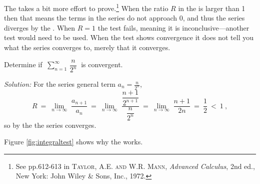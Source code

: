 The  takes a bit more effort to
prove.\footnote{See pp.612-613 in \textsc{Taylor, A.E. and W.R. Mann},
\emph{Advanced Calculus}, 2nd ed., New York: John Wiley \& Sons, Inc., 1972.}
When the ratio $R$ in the  is larger than 1 then that means the terms
in the series do not approach 0, and thus the series diverges by the . When $R=1$ the test fails, meaning it is inconclusive---another test would
need to be used. When the test shows convergence it does not tell you what the
series converges to, merely that it converges.

\newpage

\begin{exmp}
\noindent Determine if $~\displaystyle\sum_{n=1}^{\infty} \,\dfrac{n}{2^n}~$ is
convergent.\vspace{1mm}
\par\noindent\emph{Solution:} For the series general term $a_n = \frac{n}{2^n}$,
\[
R ~=~ \lim_{n \to \infty} \;\frac{a_{n+1}}{a_n} ~=~
\lim_{n \to \infty} \;\dfrac{\dfrac{n+1}{2^{n+1}}}{\dfrac{n}{2^n}} ~=~
\lim_{n \to \infty} \;\dfrac{n+1}{2n} ~=~ \frac{1}{2} ~<~ 1 ~,
\]
so by the  the series converges.
\end{exmp}
\divider


Figure \ref{fig:integraltest} shows why the  works.

